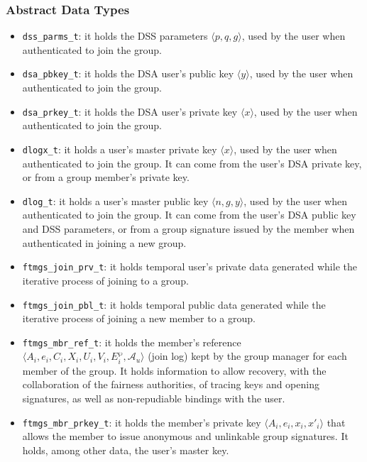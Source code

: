\documentclass[a4paper]{article}
\newcommand{\tuple}[1]{\ensuremath{\langle #1 \rangle}}
\begin{document}
\subsubsection*{Abstract Data Types}
\begin{itemize}\small
\item \verb|dss_parms_t|: it holds the DSS parameters \tuple{p, q, g},
  used by the user when authenticated to join the group.
\item \verb|dsa_pbkey_t|: it holds the DSA user's public key
  \tuple{y}, used by the user when authenticated to join the group.
\item \verb|dsa_prkey_t|: it holds the DSA user's private key
  \tuple{x}, used by the user when authenticated to join the group.
\end{itemize}
\begin{itemize}\small
\item \verb|dlogx_t|: it holds a user's master private key
  \tuple{x}, used by the user when authenticated to join the group. It
  can come from the user's DSA private key, or from a group member's
  private key.
\item \verb|dlog_t|: it holds a user's master public key \tuple{n, g,
  y}, used by the user when authenticated to join the group. It can
  come from the user's DSA public key and DSS parameters, or from a
  group signature issued by the member when authenticated in joining a
  new group.
\end{itemize}
\begin{itemize}\small
\item \verb|ftmgs_join_prv_t|: it holds temporal user's private data
  generated while the iterative process of joining to a group.
\item \verb|ftmgs_join_pbl_t|: it holds temporal public data generated
  while the iterative process of joining a new member to a group.
\item \verb|ftmgs_mbr_ref_t|: it holds the member's reference
  \tuple{A_i,e_i,C_i,X_i,U_i,V_i,E^{\wp}_i,\mathcal{A}_u} (join log)
  kept by the group manager for each member of the group. It holds
  information to allow recovery, with the collaboration of the
  fairness authorities, of tracing keys and opening signatures, as
  well as non-repudiable bindings with the user.
\item \verb|ftmgs_mbr_prkey_t|: it holds the member's private key
  \tuple{A_i,e_i,x_i,x'_i} that allows the member to issue anonymous
  and unlinkable group signatures. It holds, among other data, the
  user's master key.
\end{itemize}
\end{document}
